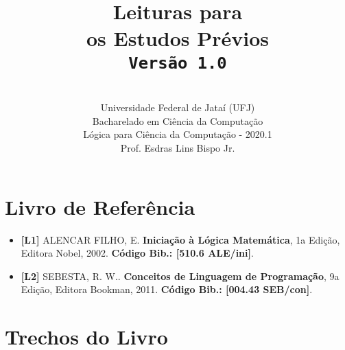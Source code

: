 \documentclass[12pt,a4paper,oneside]{article}
\author{\\Universidade Federal de Jataí (UFJ)\\Bacharelado em Ciência da Computação \\Lógica para Ciência da Computação - 2020.1 \\Prof. Esdras Lins Bispo Jr.}
\date{}
\title{
	\sc \huge Leituras para \\os Estudos Prévios
	\\{\tt Versão 1.0}
}
\begin{document}
\maketitle

\section{Livro de Referência}
	\begin{itemize}
		\item[] {\bf \color{blue} [L1]} ALENCAR FILHO, E. {\bf Iniciação à Lógica Matemática}, 1a Edição, Editora Nobel, 2002. {\color{blue} \bf Código Bib.: [510.6 ALE/ini]}.
		\item[] {\bf \color{purple} [L2]} SEBESTA, R. W.. {\bf Conceitos de Linguagem de Programação}, 9a Edição, Editora Bookman, 2011. { \color{purple} \bf Código Bib.: [004.43 SEB/con]}.
	\end{itemize}
	
\section{Trechos do Livro}
\end{document}
